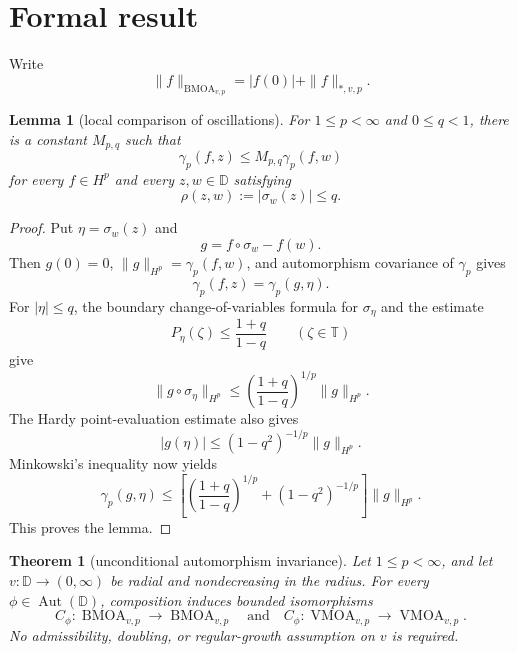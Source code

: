 \documentclass[11pt]{article}
\newtheorem{theorem}{Theorem}
\newtheorem{lemma}{Lemma}
\newcommand{\D}{\mathbb D}
\newcommand{\T}{\mathbb T}
\newcommand{\Aut}{\operatorname{Aut}(\D)}
\newcommand{\BMOA}{\operatorname{BMOA}}
\newcommand{\VMOA}{\operatorname{VMOA}}
\begin{document}
\section{Formal result}

Write
\[
 \|f\|_{\BMOA_{v,p}}=|f(0)|+\|f\|_{*,v,p}.
\]

\begin{lemma}[local comparison of oscillations]\label{lem:local}
For $1\le p<\infty$ and $0\le q<1$, there is a constant $M_{p,q}$ such that
\[
 \gamma_p(f,z)\le M_{p,q}\gamma_p(f,w)
\]
for every $f\in H^p$ and every $z,w\in\D$ satisfying
\[
 \rho(z,w):=|\sigma_w(z)|\le q.
\]
\end{lemma}

\begin{proof}
Put $\eta=\sigma_w(z)$ and
\[
 g=f\circ\sigma_w-f(w).
\]
Then $g(0)=0$, $\|g\|_{H^p}=\gamma_p(f,w)$, and automorphism covariance of $\gamma_p$ gives
\[
 \gamma_p(f,z)=\gamma_p(g,\eta).
\]
For $|\eta|\le q$, the boundary change-of-variables formula for $\sigma_\eta$ and the estimate
\[
 P_\eta(\zeta)\le \frac{1+q}{1-q}\qquad(\zeta\in\T)
\]
give
\[
 \|g\circ\sigma_\eta\|_{H^p}
 \le \left(\frac{1+q}{1-q}\right)^{1/p}\|g\|_{H^p}.
\]
The Hardy point-evaluation estimate also gives
\[
 |g(\eta)|\le (1-q^2)^{-1/p}\|g\|_{H^p}.
\]
Minkowski's inequality now yields
\[
 \gamma_p(g,\eta)
 \le \left[\left(\frac{1+q}{1-q}\right)^{1/p}+(1-q^2)^{-1/p}\right]\|g\|_{H^p}.
\]
This proves the lemma.
\end{proof}

\begin{theorem}[unconditional automorphism invariance]\label{thm:main}
Let $1\le p<\infty$, and let $v:\D\to(0,\infty)$ be radial and nondecreasing in the radius. For every $\phi\in\Aut$, composition induces bounded isomorphisms
\[
 C_\phi:\BMOA_{v,p}\longrightarrow\BMOA_{v,p}
 \quad\text{and}\quad
 C_\phi:\VMOA_{v,p}\longrightarrow\VMOA_{v,p}.
\]
No admissibility, doubling, or regular-growth assumption on $v$ is required.
\end{theorem}
\end{document}
